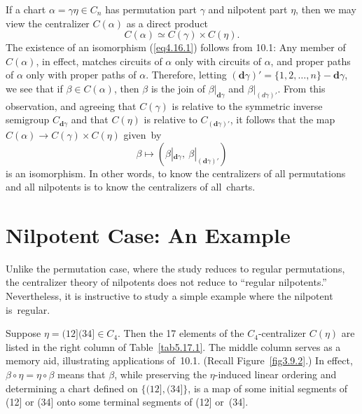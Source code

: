 \documentclass{surv-l}
\numberwithin{equation}{section}
\numberwithin{table}{section}
\numberwithin{figure}{section}
\theoremstyle{plain}
\theoremstyle{definition}
\begin{document}
If a chart $\alpha=\gamma\eta\in C_{n}$ has permutation part
$\gamma$ and nilpotent part $\eta$, then we may view the
centralizer $C(\alpha)$ as a direct product
\begin{equation}\label{eq4.16.1}
C(\alpha)\simeq C(\gamma)\times C(\eta).
\end{equation}
The existence of an isomorphism (\ref{eq4.16.1}) follows from
10.1: Any member of $C(\alpha)$, in effect, matches circuits of
$\alpha$ only with circuits of $\alpha$, and proper paths of
$\alpha$ only with proper paths of $\alpha$. Therefore, letting
$(\mathbf{d}\gamma)'=\{1,2,\ldots, n\}- \mathbf{d}\gamma$, we see
that if $\beta\in C(\alpha)$, then $\beta$ is the join of
$\beta|_{\mathbf{d}\gamma}$ and $\beta|_{(d\gamma)'}$. From this
observation, and agreeing that $C(\gamma)$ is relative to the
symmetric inverse semigroup $C_{\mathbf{d}\gamma}$ and that
$C(\eta)$ is relative to $C_{(\mathbf{d}\gamma)'}$, it follows
that the map $C(\alpha)\rightarrow C(\gamma)\times C(\eta)$
given~by
\[
\beta\mapsto(\beta|_{\mathbf{d}\gamma},\ \beta|_{(\mathbf{d}\gamma)'})
\]
is an isomorphism. In other words, to know the centralizers of all
permutations and all nilpotents is to know the centralizers of
all~charts.

\setcounter{section}{16}
\section{Nilpotent Case: An Example}\label{sec5.17}

Unlike the permutation case, where the study reduces to regular
permutations, the centralizer theory of nilpotents does not reduce
to ``regular nilpotents.'' Nevertheless, it is instructive to
study a simple example where the nilpotent is~regular.

Suppose $\eta=(12](34]\in C_{4}$. Then the 17 elements of the
$C_{4}$-centralizer $C(\eta)$ are listed in the right column of
Table~\ref{tab5.17.1}. The middle column serves as a memory aid,
illustrating applications of~10.1. (Recall Figure~\ref{fig3.9.2}.)
In effect, $\beta \circ\eta=\eta \circ\beta$ means that $\beta$, while
preserving the $\eta$-induced linear ordering and determining a
chart defined on $\{(12],(34]\}$, is a map of some initial
segments of (12] or (34] onto some terminal segments of (12]
or~(34].
\end{document}
